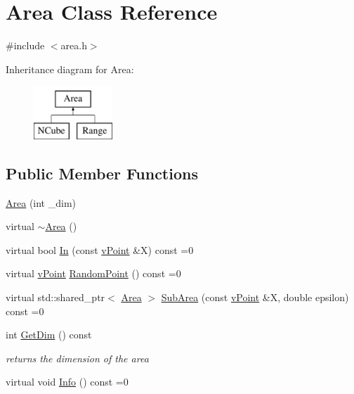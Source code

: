 \hypertarget{class_area}{}\section{Area Class Reference}
\label{class_area}


{\ttfamily \#include $<$area.\+h$>$}

Inheritance diagram for Area\+:\begin{figure}[H]
\begin{center}
\leavevmode
\includegraphics[height=2.000000cm]{class_area}
\end{center}
\end{figure}
\subsection*{Public Member Functions}
\begin{DoxyCompactItemize}
\item 
\hyperlink{class_area_acb26df340d249e1704501d55cacbc93e}{Area} (int \+\_\+dim)
\item 
virtual \hyperlink{class_area_a5ed5a9705b2715f347b764894c5015f0}{$\sim$\+Area} ()
\item 
virtual bool \hyperlink{class_area_a08775973fcf205fb91654b25a08f6bea}{In} (const \hyperlink{classv_point}{v\+Point} \&X) const =0
\item 
virtual \hyperlink{classv_point}{v\+Point} \hyperlink{class_area_a8a921495c0cca4095c8386f7b48ef086}{Random\+Point} () const =0
\item 
virtual std\+::shared\+\_\+ptr$<$ \hyperlink{class_area}{Area} $>$ \hyperlink{class_area_a8f28e6be12d6b1bf7217f51307ab937e}{Sub\+Area} (const \hyperlink{classv_point}{v\+Point} \&X, double epsilon) const =0
\item 
int \hyperlink{class_area_a4a7d5f99dd276ecc047fe75f448432ec}{Get\+Dim} () const
\begin{DoxyCompactList}\small\item\em returns the dimension of the area \end{DoxyCompactList}\item 
virtual void \hyperlink{class_area_abc427001b3685b08cd836badffedfbbe}{Info} () const =0
\end{DoxyCompactItemize}
